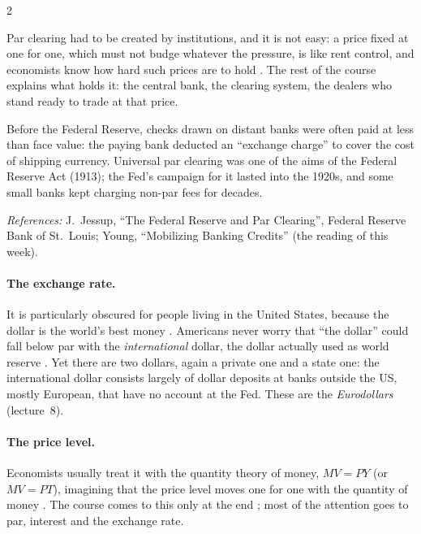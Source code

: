\begin{paracol}{2}
\begin{intuition}
Par clearing had to be created by institutions, and it is not easy: a price fixed at one for one, which must not
budge whatever the pressure, is like rent control, and economists know how hard such prices are to hold
. The rest of the course explains what holds it: the central bank, the clearing system, the
dealers who stand ready to trade at that price.
\end{intuition}\begin{history}
Before the Federal Reserve, checks drawn on distant banks were often paid at less than face value: the paying bank
deducted an ``exchange charge'' to cover the cost of shipping currency. Universal par clearing was one of the aims of
the Federal Reserve Act (1913); the Fed's campaign for it lasted into the 1920s, and some small banks kept charging
non-par fees for decades.\par
\emph{References:} J.~Jessup, ``The Federal Reserve and Par Clearing'', Federal Reserve Bank of St.~Louis; Young,
``Mobilizing Banking Credits'' (the reading of this week).
\end{history}

\paragraph{The exchange rate.} It is particularly obscured for people living in the United States, because the dollar
is the world's best money . Americans never worry that ``the dollar'' could fall below par with the
\emph{international} dollar, the dollar actually used as world reserve . Yet there are two dollars, again
a private one and a state one: the international dollar consists largely of dollar deposits at banks outside the US,
mostly European, that have no account at the Fed. These are the \emph{Eurodollars} (lecture~8).

\paragraph{The price level.} Economists usually treat it with the quantity theory of money, $MV=PY$ (or $MV=PT$),
imagining that the price level moves one for one with the quantity of money . The course comes to this
only at the end ; most of the attention goes to par, interest and the exchange rate.


\end{paracol}
